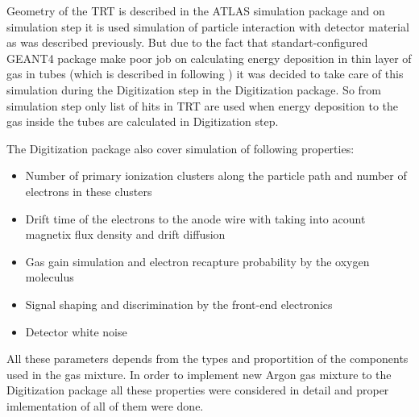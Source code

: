 
Geometry of the TRT is described in the ATLAS simulation package and on simulation step it is used simulation of particle interaction with detector material as was described previously.
But due to the fact that standart-configured GEANT4 package make poor job on calculating energy deposition in thin layer of gas in tubes 
(which is described in following ) it was decided to take care of this simulation during the Digitization step in the Digitization package.
So from simulation step only list of hits in TRT are used when energy deposition to the gas inside the tubes are calculated in Digitization step.

The Digitization package also cover simulation of following properties:
\begin{itemize}
 \item Number of primary ionization clusters along the particle path and number of electrons in these clusters
 \item Drift time of the electrons to the anode wire with taking into acount magnetix flux density and drift diffusion
 \item Gas gain simulation and electron recapture probability by the oxygen moleculus %
 \item Signal shaping and discrimination by the front-end electronics
 \item Detector white noise
\end{itemize}

All these parameters depends from the types and proportition of the components used in the gas mixture. 
In order to implement new Argon gas mixture to the Digitization package all these properties were considered in detail 
and proper imlementation of all of them were done.


